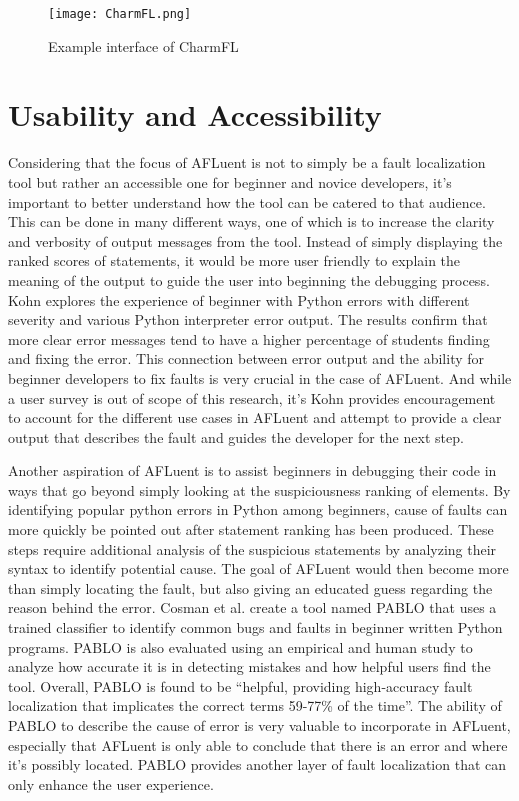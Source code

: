 \begin{figure}[!htb]
	\begin{center}
		\texttt{[image: CharmFL.png]}
		\caption{\label{fig:charmfl} Example interface of CharmFL \cite{sarhan2021charmfl}}
	\end{center}
\end{figure}

\section{Usability and Accessibility}
\label{sec:usability_accessibility}

Considering that the focus of AFLuent is not to simply be a fault localization
tool but rather an accessible one for beginner and novice developers, it's
important to better understand how the tool can be catered to that audience.
This can be done in many different ways, one of which is to increase the clarity
and verbosity of output messages from the tool. Instead of simply displaying the
ranked scores of statements, it would be more user friendly to explain the
meaning of the output to guide the user into beginning the debugging process.
Kohn \cite{kohn2019error} explores the experience of beginner with Python errors
with different severity and various Python interpreter error output. The results
confirm that more clear error messages tend to have a higher percentage of
students finding and fixing the error. This connection between error output and
the ability for beginner developers to fix faults is very crucial in the case of
AFLuent. And while a user survey is out of scope of this research, it's Kohn
provides encouragement to account for the different use cases in AFLuent and
attempt to provide a clear output that describes the fault and guides the
developer for the next step.

Another aspiration of AFLuent is to assist beginners in debugging their code in
ways that go beyond simply looking at the suspiciousness ranking of elements. By
identifying popular python errors in Python among beginners, cause of faults can
more quickly be pointed out after statement ranking has been produced. These
steps require additional analysis of the suspicious statements by analyzing
their syntax to identify potential cause. The goal of AFLuent would then become
more than simply locating the fault, but also giving an educated guess regarding
the reason behind the error. Cosman et al. \cite{cosman2020pablo} create a tool
named PABLO that uses a trained classifier to identify common bugs and faults in
beginner written Python programs. PABLO is also evaluated using an empirical and
human study to analyze how accurate it is in detecting mistakes and how helpful
users find the tool. Overall, PABLO is found to be ``helpful, providing
high-accuracy fault localization that implicates the correct terms
59-77\% of the time''. The ability of PABLO to describe the cause of error is
very valuable to incorporate in AFLuent, especially that AFLuent is only able to
conclude that there is an error and where it's possibly located. PABLO provides
another layer of fault localization that can only enhance the user experience.

